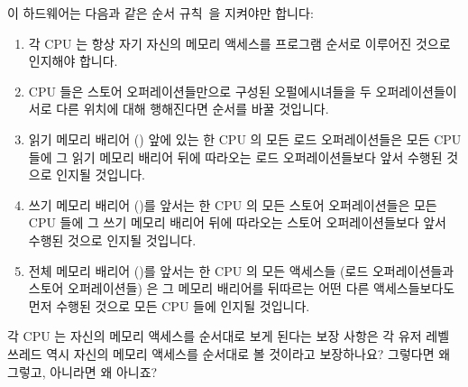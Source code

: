 이 하드웨어는 다음과 같은 순서
규칙~\cite{PaulMcKenney2005i,PaulMcKenney2005j}을 지켜야만 합니다:
\begin{enumerate}
\item	각 CPU 는 항상 자기 자신의 메모리 액세스를 프로그램 순서로 이루어진
	것으로 인지해야 합니다.
\item	CPU 들은 스토어 오퍼레이션들만으로 구성된 오펄에시녀들을 두
	오퍼레이션들이 서로 다른 위치에 대해 행해진다면 순서를 바꿀 것입니다.
\item	읽기 메모리 배리어 () 앞에 있는 한 CPU 의 모든 로드
	오퍼레이션들은 모든 CPU 들에 그 읽기 메모리 배리어 뒤에 따라오는 로드
	오퍼레이션들보다 앞서 수행된 것으로 인지될 것입니다.
\item	쓰기 메모리 배리어 ()를 앞서는 한 CPU 의 모든 스토어
	오퍼레이션들은 모든 CPU 들에 그 쓰기 메모리 배리어 뒤에 따라오는 스토어
	오퍼레이션들보다 앞서 수행된 것으로 인지될 것입니다.
\item	전체 메모리 배리어 ()를 앞서는 한 CPU 의 모든 액세스들
	(로드 오퍼레이션들과 스토어 오퍼레이션들) 은 그 메모리 배리어를
	뒤따르는 어떤 다른 액세스들보다도 먼저 수행된 것으로 모든 CPU 들에
	인지될 것입니다.
\end{enumerate}

\QuickQuiz{}
	각 CPU 는 자신의 메모리 액세스를 순서대로 보게 된다는 보장 사항은 각
	유저 레벨 쓰레드 역시 자신의 메모리 액세스를 순서대로 볼 것이라고
	보장하나요?
	그렇다면 왜 그렇고, 아니라면 왜 아니죠?
	\iffalse


